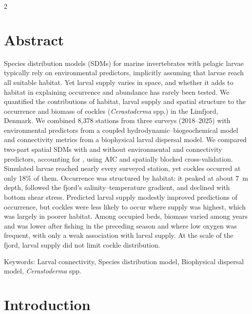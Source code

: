 \begin{spacing}{2}
\section*{Abstract}
Species distribution models (SDMs) for marine invertebrates with pelagic larvae typically rely on environmental predictors, implicitly assuming that larvae reach all suitable habitat. Yet larval supply varies in space, and whether it adds to habitat in explaining occurrence and abundance has rarely been tested. We quantified the contributions of habitat, larval supply and spatial structure to the occurrence and biomass of cockles (\textit{Cerastoderma} spp.) in the Limfjord, Denmark. We combined 8{,}378 stations from three surveys (2018--2025) with environmental predictors from a coupled hydrodynamic--biogeochemical model and connectivity metrics from a biophysical larval dispersal model. We compared two-part spatial SDMs with and without environmental and connectivity predictors, accounting for , using AIC and spatially blocked cross-validation. Simulated larvae reached nearly every surveyed station, yet cockles occurred at only 18\% of them. Occurrence was structured by habitat: it peaked at about 7~m depth, followed the fjord's salinity--temperature gradient, and declined with bottom shear stress. Predicted larval supply modestly improved predictions of occurrence, but cockles were less likely to occur where supply was highest, which was largely in poorer habitat. Among occupied beds, biomass varied among years and was lower after fishing in the preceding season and where low oxygen was frequent, with only a weak association with larval supply. At the scale of the fjord, larval supply did not limit cockle distribution. 



\vspace*{\fill}
\noindent
Keywords:
Larval connectivity,
Species distribution model,
Biophysical dispersal model,
\textit{Cerastoderma} spp.\\
\clearpage
\section{Introduction}


\end{spacing}
